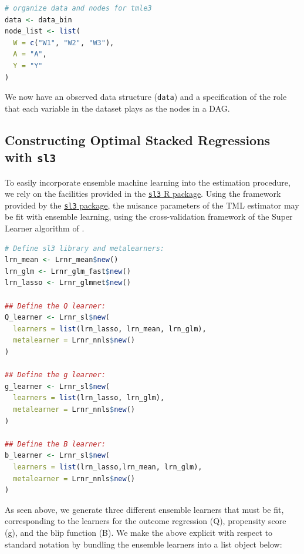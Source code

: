 \documentclass[
  12pt, krantz2,
]{krantz}
\newcommand{\passthrough}[1]{#1}
\theoremstyle{definition}
\theoremstyle{definition}
\theoremstyle{definition}
\newcommand{\1}{\mathbbm{1}}
\begin{document}
\begin{lstlisting}[language=R]
# organize data and nodes for tmle3
data <- data_bin
node_list <- list(
  W = c("W1", "W2", "W3"),
  A = "A",
  Y = "Y"
)
\end{lstlisting}

We now have an observed data structure (\passthrough{\lstinline!data!}) and a specification of the role
that each variable in the dataset plays as the nodes in a DAG.

\hypertarget{constructing-optimal-stacked-regressions-with-sl3}{%
\subsection{\texorpdfstring{Constructing Optimal Stacked Regressions with \texttt{sl3}}{Constructing Optimal Stacked Regressions with sl3}}\label{constructing-optimal-stacked-regressions-with-sl3}}

To easily incorporate ensemble machine learning into the estimation procedure,
we rely on the facilities provided in the \href{https://tlverse.org/sl3}{\passthrough{\lstinline!sl3!} R
package}. Using the framework provided by the \href{https://tlverse.org/sl3}{\passthrough{\lstinline!sl3!}
package}, the nuisance parameters of the TML estimator
may be fit with ensemble learning, using the cross-validation framework of the
Super Learner algorithm of \citet{vdl2007super}.

\begin{lstlisting}[language=R]
# Define sl3 library and metalearners:
lrn_mean <- Lrnr_mean$new()
lrn_glm <- Lrnr_glm_fast$new()
lrn_lasso <- Lrnr_glmnet$new()

## Define the Q learner:
Q_learner <- Lrnr_sl$new(
  learners = list(lrn_lasso, lrn_mean, lrn_glm),
  metalearner = Lrnr_nnls$new()
)

## Define the g learner:
g_learner <- Lrnr_sl$new(
  learners = list(lrn_lasso, lrn_glm),
  metalearner = Lrnr_nnls$new()
)

## Define the B learner:
b_learner <- Lrnr_sl$new(
  learners = list(lrn_lasso,lrn_mean, lrn_glm),
  metalearner = Lrnr_nnls$new()
)
\end{lstlisting}

As seen above, we generate three different ensemble learners that must be fit,
corresponding to the learners for the outcome regression (Q), propensity score
(g), and the blip function (B). We make the above explicit with respect to
standard notation by bundling the ensemble learners into a list object below:
\end{document}

